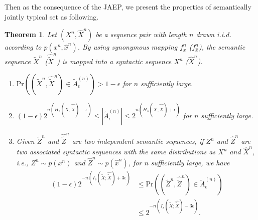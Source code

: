 \documentclass[12pt, draftclsnofoot,onecolumn]{IEEEtran}
\newtheorem{theorem}{\bf{Theorem}}
\begin{document}
Then as the consequence of the JAEP, we present the properties of semantically jointly typical set as following.
\begin{theorem}\label{Distortion_JAEP_theorem}
Let $(X^n, \hat{X}^n)$ be a sequence pair with length $n$ drawn i.i.d. according to $p(x^n,\hat{x}^n)$. By using synonymous mapping $f_x^n$ ($f_{\hat{x}}^n$), the semantic sequence $\tilde{X}^n$ ($\hat{\tilde{X}}^n$) is mapped into a syntactic sequence $X^n$ ($\hat{X}^n$).
\begin{enumerate}[(1)]
    \item $\text{Pr}\left((\tilde{X}^n,\hat{\tilde{X}}^n)\in \tilde{A}_{\epsilon}^{(n)}\right)>1-\epsilon$ for $n$ sufficiently large.
    \item $\left(1-\epsilon\right) 2^{n\left(H_s(\tilde{X},\hat{\tilde{X}})-\epsilon\right)}\leq \left|\tilde{A}_{\epsilon}^{(n)}\right| \leq 2^{n\left(H_s(\tilde{X},\hat{\tilde{X}})+\epsilon\right)}$ for $n$ sufficiently large.
    \item Given $\tilde{Z}^n$ and $\hat{\tilde{Z}}^n$ are two independent semantic sequences, if $Z^n$ and $\hat{Z}^n$ are two associated syntactic sequences with the same distributions as $X^n$ and $\hat{X}^n$, i.e., $Z^n\sim p(x^n)$ and $\hat{Z}^n\sim p(\hat{x}^n)$, for $n$ sufficiently large, we have
        \begin{equation}\label{seperate_typical_equality}
        \begin{aligned}
        (1-\epsilon)2^{-n(I_s(\tilde{X};\hat{\tilde{X}})+3\epsilon)}&\leq \text{Pr}\left((\tilde{Z}^n,\hat{\tilde{Z}}^n)\in \tilde{A}_{\epsilon}^{(n)}\right)\\
        & \leq 2^{-n(I_s(\tilde{X};\hat{\tilde{X}})-3\epsilon)}.
        \end{aligned}
        \end{equation}
\end{enumerate}
\end{theorem}
\end{document}
